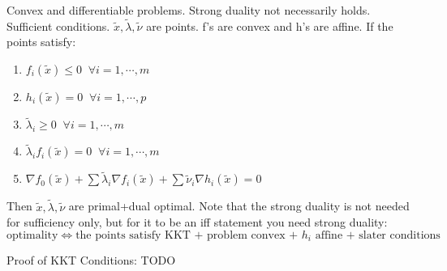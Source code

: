 \begin{theorem}
	Convex and differentiable problems. Strong duality not necessarily holds. Sufficient conditions. $\tilde{x}, \tilde{\lambda}, \tilde{\nu}$ are points. f's are convex and h's are affine. If the points satisfy:
	\begin{enumerate}
		\item $f_i(\tilde{x}) \le 0\;\; \forall i=1,\cdots,m $
		\item $h_i(\tilde{x}) = 0\;\; \forall i=1,\cdots,p$
		\item $\tilde{\lambda}_i \ge 0 \;\; \forall i=1,\cdots,m$
		\item $\tilde{\lambda}_if_i(\tilde{x}) = 0 \;\; \forall i=1,\cdots,m$
		\item $\nabla f_0(\tilde{x})+\sum \tilde{\lambda}_i\nabla f_i(\tilde{x}) +\sum\tilde{\nu}_i\nabla h_i(\tilde{x}) = 0$
	\end{enumerate}
	Then $\tilde{x}, \tilde{\lambda}, \tilde{\nu}$ are primal+dual optimal. Note that the strong duality is not needed for sufficiency only, but for it to be an iff statement you need strong duality: 
	\[
\text{optimality} \iff \text{the points satisfy KKT + problem convex + $h_i$ affine + slater conditions}
	\]
\end{theorem}
Proof of KKT Conditions: TODO


